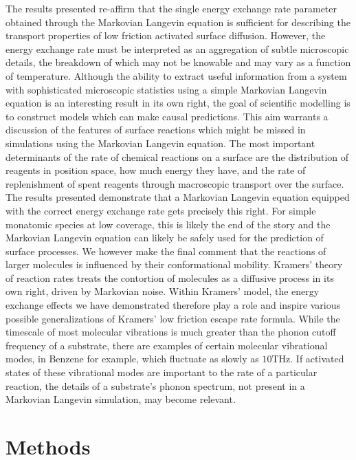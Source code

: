\documentclass[7pt]{article}
\newcommand{\THz}{\si{\tera\hertz}}
\begin{document}
The results presented re-affirm that the single energy exchange rate parameter obtained through the Markovian Langevin equation is sufficient for describing the transport properties of low friction activated surface diffusion. However, the energy exchange rate must be interpreted as an aggregation of subtle microscopic details, the breakdown of which may not be knowable and may vary as a function of temperature. Although the ability to extract useful information from a system with sophisticated microscopic statistics using a simple Markovian Langevin equation is an interesting result in its own right, the goal of scientific modelling is to construct models which can make causal predictions. This aim warrants a discussion of the features of surface reactions which might be missed in simulations using the Markovian Langevin equation. The most important determinants of the rate of chemical reactions on a surface are the distribution of reagents in position space, how much energy they have, and the rate of replenishment of spent reagents through macroscopic transport over the surface. The results presented demonstrate that a Markovian Langevin equation equipped with the correct energy exchange rate gets precisely this right. For simple monatomic species at low coverage, this is likely the end of the story and the Markovian Langevin equation can likely be safely used for the prediction of surface processes. We however make the final comment that the reactions of larger molecules is influenced by their conformational mobility. Kramers' theory of reaction rates treats the contortion of molecules as a diffusive process in its own right, driven by Markovian noise\cite{Kramers, Zwanzig}. Within Kramers' model, the energy exchange effects we have demonstrated therefore play a role and inspire various possible generalizations of Kramers' low friction escape rate formula. While the timescale of most molecular vibrations is much greater than the phonon cutoff frequency of a substrate, there are examples of certain molecular vibrational modes, in Benzene for example\cite{Wang2020}, which fluctuate as slowly as $10\THz$. If activated states of these vibrational modes are important to the rate of a particular reaction, the details of a substrate's phonon spectrum, not present in a Markovian Langevin simulation, may become relevant. 

\section*{Methods}
\end{document}
